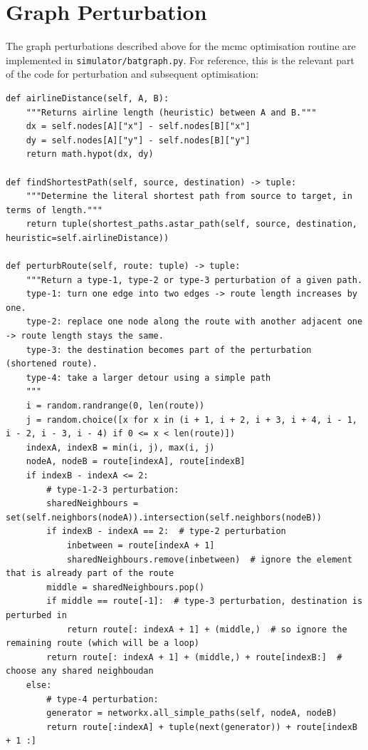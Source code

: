 \documentclass{prettytex/ox/mmsc-special-topic}
\begin{document}
  \section{Graph Perturbation}
  The graph perturbations described above for the \gls{mcmc} optimisation routine are implemented in \texttt{simulator/batgraph.py}. For reference, this is the relevant part of the code for perturbation and subsequent optimisation:

  \begin{verbatim}
def airlineDistance(self, A, B):
    """Returns airline length (heuristic) between A and B."""
    dx = self.nodes[A]["x"] - self.nodes[B]["x"]
    dy = self.nodes[A]["y"] - self.nodes[B]["y"]
    return math.hypot(dx, dy)

def findShortestPath(self, source, destination) -> tuple:
    """Determine the literal shortest path from source to target, in terms of length."""
    return tuple(shortest_paths.astar_path(self, source, destination, heuristic=self.airlineDistance))

def perturbRoute(self, route: tuple) -> tuple:
    """Return a type-1, type-2 or type-3 perturbation of a given path.
    type-1: turn one edge into two edges -> route length increases by one.
    type-2: replace one node along the route with another adjacent one -> route length stays the same.
    type-3: the destination becomes part of the perturbation (shortened route).
    type-4: take a larger detour using a simple path
    """
    i = random.randrange(0, len(route))
    j = random.choice([x for x in (i + 1, i + 2, i + 3, i + 4, i - 1, i - 2, i - 3, i - 4) if 0 <= x < len(route)])
    indexA, indexB = min(i, j), max(i, j)
    nodeA, nodeB = route[indexA], route[indexB]
    if indexB - indexA <= 2:
        # type-1-2-3 perturbation:
        sharedNeighbours = set(self.neighbors(nodeA)).intersection(self.neighbors(nodeB))
        if indexB - indexA == 2:  # type-2 perturbation
            inbetween = route[indexA + 1]
            sharedNeighbours.remove(inbetween)  # ignore the element that is already part of the route
        middle = sharedNeighbours.pop()
        if middle == route[-1]:  # type-3 perturbation, destination is perturbed in
            return route[: indexA + 1] + (middle,)  # so ignore the remaining route (which will be a loop)
        return route[: indexA + 1] + (middle,) + route[indexB:]  # choose any shared neighboudan
    else:
        # type-4 perturbation:
        generator = networkx.all_simple_paths(self, nodeA, nodeB)
        return route[:indexA] + tuple(next(generator)) + route[indexB + 1 :]
  \end{verbatim}

  \printnoidxglossary[type=acronym, title={Acronyms}]
\end{document}
